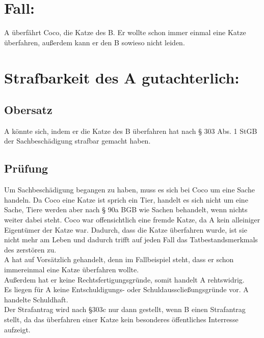 \documentclass[a4paper]{article}
\begin{document}
\section*{Fall:}
A überfährt Coco, die Katze des B. Er wollte schon immer einmal eine Katze überfahren, außerdem kann er den B sowieso nicht leiden.
\section*{Strafbarkeit des A gutachterlich:}
\subsection*{Obersatz}
A könnte sich, indem er die Katze des B überfahren hat nach § 303 Abs. 1 StGB der Sachbeschädigung strafbar gemacht haben.\\
\subsection*{Prüfung}
Um Sachbeschädigung begangen zu haben, muss es sich bei Coco um eine Sache handeln. Da Coco eine Katze ist sprich ein Tier, handelt es sich nicht um eine Sache, Tiere werden aber nach § 90a BGB wie Sachen behandelt, wenn nichts weiter dabei steht. Coco war offensichtlich eine fremde Katze, da A kein alleiniger Eigentümer der Katze war. Dadurch, dass die Katze überfahren wurde, ist sie nicht mehr am Leben und dadurch trifft auf jeden Fall das Tatbestandsmerkmals des zerstören zu.\\
A hat auf Vorsätzlich gehandelt, denn im Fallbeispiel steht, dass er schon immereinmal eine Katze überfahren wollte.\\
Außerdem hat er keine Rechtsfertigungsgründe, somit handelt A rehtswidrig.\\
Es liegen für A keine Entschuldigungs- oder Schuldausscließungsgründe vor. A handelte Schuldhaft.\\
Der Strafantrag wird nach §303c nur dann gestellt, wenn B einen Strafantrag stellt, da das überfahren einer Katze kein besonderes öffentliches Interresse aufzeigt.
\end{document}
